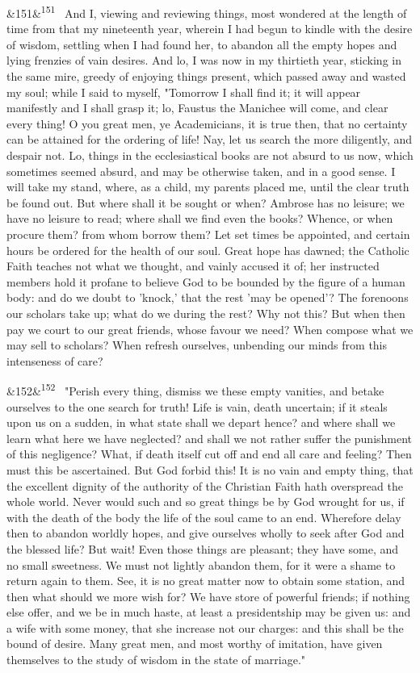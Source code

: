 \documentclass[12pt]{article}
\newcommand{\para}[1][]{\par\noindent\ifx&#1&\else\textsuperscript{\footnotesize #1}~\fi}
\begin{document}
\para[151] And I, viewing and reviewing things, most wondered at the length of time from that my nineteenth year, wherein I had begun to kindle with the desire of wisdom, settling when I had found her, to abandon all the empty hopes and lying frenzies of vain desires. And lo, I was now in my thirtieth year, sticking in the same mire, greedy of enjoying things present, which passed away and wasted my soul; while I said to myself, "Tomorrow I shall find it; it will appear manifestly and I shall grasp it; lo, Faustus the Manichee will come, and clear every thing! O you great men, ye Academicians, it is true then, that no certainty can be attained for the ordering of life! Nay, let us search the more diligently, and despair not. Lo, things in the ecclesiastical books are not absurd to us now, which sometimes seemed absurd, and may be otherwise taken, and in a good sense. I will take my stand, where, as a child, my parents placed me, until the clear truth be found out. But where shall it be sought or when? Ambrose has no leisure; we have no leisure to read; where shall we find even the books? Whence, or when procure them? from whom borrow them? Let set times be appointed, and certain hours be ordered for the health of our soul. Great hope has dawned; the Catholic Faith teaches not what we thought, and vainly accused it of; her instructed members hold it profane to believe God to be bounded by the figure of a human body: and do we doubt to 'knock,' that the rest 'may be opened'? The forenoons our scholars take up; what do we during the rest? Why not this? But when then pay we court to our great friends, whose favour we need? When compose what we may sell to scholars? When refresh ourselves, unbending our minds from this intenseness of care?

\para[152] "Perish every thing, dismiss we these empty vanities, and betake ourselves to the one search for truth! Life is vain, death uncertain; if it steals upon us on a sudden, in what state shall we depart hence? and where shall we learn what here we have neglected? and shall we not rather suffer the punishment of this negligence? What, if death itself cut off and end all care and feeling? Then must this be ascertained. But God forbid this! It is no vain and empty thing, that the excellent dignity of the authority of the Christian Faith hath overspread the whole world. Never would such and so great things be by God wrought for us, if with the death of the body the life of the soul came to an end. Wherefore delay then to abandon worldly hopes, and give ourselves wholly to seek after God and the blessed life? But wait! Even those things are pleasant; they have some, and no small sweetness. We must not lightly abandon them, for it were a shame to return again to them. See, it is no great matter now to obtain some station, and then what should we more wish for? We have store of powerful friends; if nothing else offer, and we be in much haste, at least a presidentship may be given us: and a wife with some money, that she increase not our charges: and this shall be the bound of desire. Many great men, and most worthy of imitation, have given themselves to the study of wisdom in the state of marriage."
\end{document}
